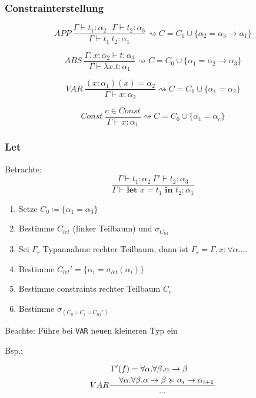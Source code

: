 \subsubsection{Constrainterstellung}
\label{typ:con:crea}
$$APP \medspace\frac{\Gamma \vdash t_1 : \alpha_2 \medspace\medspace\medspace \Gamma \vdash t_2 : \alpha_3}{\Gamma \vdash t_1 \medspace t_2 : \alpha_1} \rightsquigarrow C = C_0 \cup \{\alpha_2 = \alpha_3 \rightarrow \alpha_1\}$$

$$ABS \medspace\frac{\Gamma, x : \alpha_2 \vdash t : \alpha_3}{\Gamma \vdash \lambda x.t:\alpha_1} \rightsquigarrow C = C_0 \cup \{\alpha_1 = \alpha_2 \rightarrow \alpha_3\}$$

$$VAR \medspace\frac{(x: \alpha_1)(x) = \alpha_2}{\Gamma \vdash x : \alpha_2} \rightsquigarrow C = C_0 \cup \{\alpha_1 = \alpha_2\}$$

$$Const \medspace\frac{c \in Const}{\Gamma \vdash x : \alpha_1} \rightsquigarrow C = C_0 \cup \{\alpha_1 = \alpha_c\}$$

\subsubsection{Let}
Betrachte:
$$\frac{\Gamma \vdash t_1: \alpha_2 \medspace \Gamma' \vdash t_2: \alpha_3}{\Gamma \vdash \textbf{let } x = t_1 \textbf{ in } t_2 : \alpha_1}$$

\begin{enumerate}
	\item Setze $C_0 \coloneqq \{ \alpha_1 = \alpha_3 \}$
	\item Bestimme $C_{let}$ (linker Teilbaum) und $\sigma_{C_{let}}$
	\item Sei $\Gamma_r$ Typannahme rechter Teilbaum, dann ist $\Gamma_r = \Gamma, x: \forall \alpha. ...$
	\item Bestimme $C_{let}' = \{\alpha_i = \sigma_{let}(\alpha_i)\}$
	\item Bestimme constraints rechter Teilbaum $C_r$
	\item Bestimme $\sigma_{(C_0 \cup C_r \cup C_{let}')}$
\end{enumerate}

Beachte: Führe bei \texttt{VAR} neuen kleineren Typ ein

Bsp.:

$$VAR \frac{\splitdfrac{\Gamma'(f) = \forall \alpha. \forall \beta. \alpha \rightarrow \beta}{\forall \alpha. \forall \beta. \alpha \rightarrow \beta \succcurlyeq \alpha_i \rightarrow \alpha_{i+1}}}{...}$$